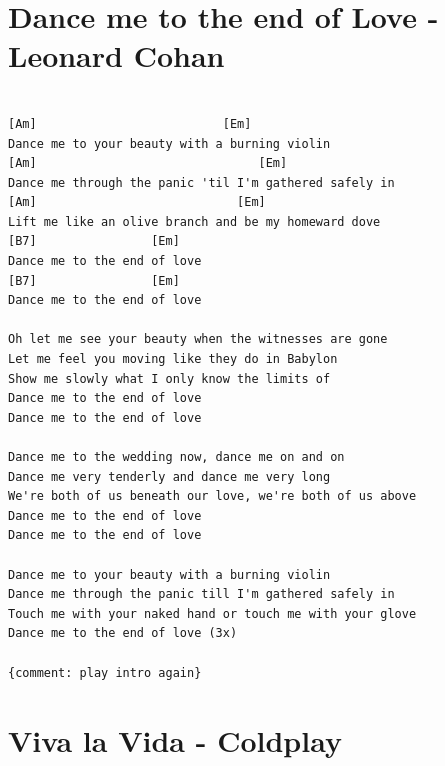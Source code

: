 \documentclass[
]{book}
\let\stdsection\section
\renewcommand\section{\clearpage\stdsection}
\begin{document}
\hypertarget{dance-me-to-the-end-of-love---leonard-cohan}{%
\section{Dance me to the end of Love - Leonard Cohan}\label{dance-me-to-the-end-of-love---leonard-cohan}}

\begin{verbatim}

[Am]                          [Em]
Dance me to your beauty with a burning violin
[Am]                               [Em]
Dance me through the panic 'til I'm gathered safely in
[Am]                            [Em]
Lift me like an olive branch and be my homeward dove
[B7]                [Em]
Dance me to the end of love
[B7]                [Em]
Dance me to the end of love

Oh let me see your beauty when the witnesses are gone 
Let me feel you moving like they do in Babylon 
Show me slowly what I only know the limits of 
Dance me to the end of love 
Dance me to the end of love 

Dance me to the wedding now, dance me on and on 
Dance me very tenderly and dance me very long 
We're both of us beneath our love, we're both of us above 
Dance me to the end of love 
Dance me to the end of love

Dance me to your beauty with a burning violin 
Dance me through the panic till I'm gathered safely in 
Touch me with your naked hand or touch me with your glove 
Dance me to the end of love (3x)

{comment: play intro again}
\end{verbatim}

\hypertarget{viva-la-vida---coldplay}{%
\section{Viva la Vida - Coldplay}\label{viva-la-vida---coldplay}}
\end{document}
